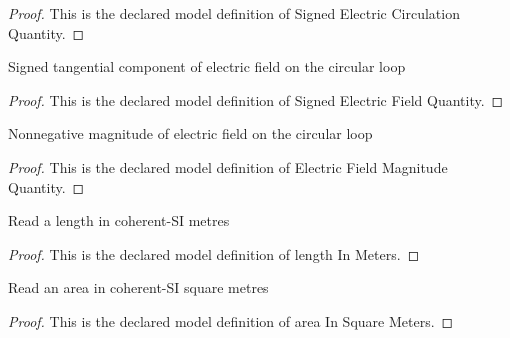 \begin{proof}
  This is the declared model definition of Signed Electric Circulation Quantity.
\end{proof}
\begin{definition}
  \label{def:physics:phyx-mini-0938:phyxminiproblems-problemphyxmini0938-signedelectricfieldquantity}
  Signed tangential component of electric field on the circular loop
\end{definition}
\begin{proof}
  This is the declared model definition of Signed Electric Field Quantity.
\end{proof}
\begin{definition}
  \label{def:physics:phyx-mini-0938:phyxminiproblems-problemphyxmini0938-electricfieldmagnitudequantity}
  Nonnegative magnitude of electric field on the circular loop
\end{definition}
\begin{proof}
  This is the declared model definition of Electric Field Magnitude Quantity.
\end{proof}
\begin{definition}
  \label{def:physics:phyx-mini-0938:phyxminiproblems-problemphyxmini0938-lengthinmeters}
  Read a length in coherent-SI metres
\end{definition}
\begin{proof}
  This is the declared model definition of length In Meters.
\end{proof}
\begin{definition}
  \label{def:physics:phyx-mini-0938:phyxminiproblems-problemphyxmini0938-areainsquaremeters}
  Read an area in coherent-SI square metres
\end{definition}
\begin{proof}
  This is the declared model definition of area In Square Meters.
\end{proof}
